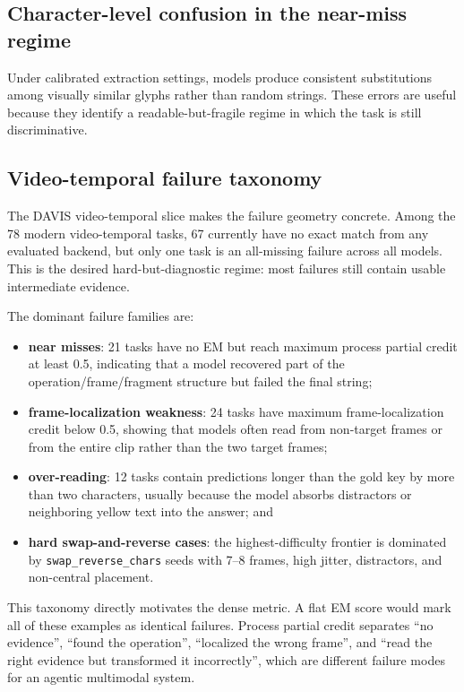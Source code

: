 \subsection{Character-level confusion in the near-miss regime}

Under calibrated extraction settings, models produce consistent substitutions
among visually similar glyphs rather than random strings. These errors are
useful because they identify a readable-but-fragile regime in which the task is
still discriminative.

\subsection{Video-temporal failure taxonomy}

The DAVIS video-temporal slice makes the failure geometry concrete. Among the
78 modern video-temporal tasks, 67 currently have no exact match from any
evaluated backend, but only one task is an all-missing failure across all
models. This is the desired hard-but-diagnostic regime: most failures still
contain usable intermediate evidence.

The dominant failure families are:
\begin{itemize}
  \item \textbf{near misses}: 21 tasks have no EM but reach maximum process
        partial credit at least 0.5, indicating that a model recovered part of
        the operation/frame/fragment structure but failed the final string;
  \item \textbf{frame-localization weakness}: 24 tasks have maximum
        frame-localization credit below 0.5, showing that models often read
        from non-target frames or from the entire clip rather than the two
        target frames;
  \item \textbf{over-reading}: 12 tasks contain predictions longer than the
        gold key by more than two characters, usually because the model absorbs
        distractors or neighboring yellow text into the answer; and
  \item \textbf{hard swap-and-reverse cases}: the highest-difficulty frontier
        is dominated by \texttt{swap\_reverse\_chars} seeds with 7--8 frames,
        high jitter, distractors, and non-central placement.
\end{itemize}

This taxonomy directly motivates the dense metric. A flat EM score would mark
all of these examples as identical failures. Process partial credit separates
``no evidence'', ``found the operation'', ``localized the wrong frame'', and
``read the right evidence but transformed it incorrectly'', which are different
failure modes for an agentic multimodal system.

